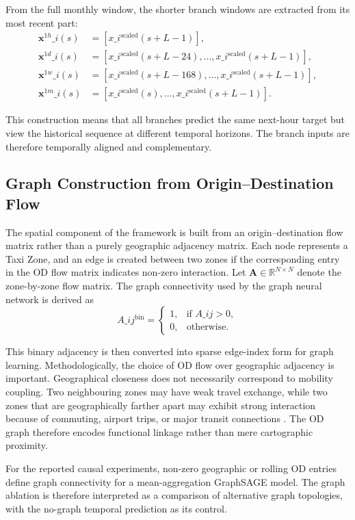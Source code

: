 \documentclass[12pt,a4paper]{report}
\begin{document}
From the full monthly window, the shorter branch windows are extracted from its most recent part:
\begin{align*}
	\mathbf{x}^{1h}\_i(s) &= [x\_i^{\text{scaled}}(s+L-1)],\\
	\mathbf{x}^{1d}\_i(s) &= [x\_i^{\text{scaled}}(s+L-24), \dots, x\_i^{\text{scaled}}(s+L-1)],\\
	\mathbf{x}^{1w}\_i(s) &= [x\_i^{\text{scaled}}(s+L-168), \dots, x\_i^{\text{scaled}}(s+L-1)],\\
	\mathbf{x}^{1m}\_i(s) &= [x\_i^{\text{scaled}}(s), \dots, x\_i^{\text{scaled}}(s+L-1)].
\end{align*}

This construction means that all branches predict the same next-hour target but view the historical sequence at different temporal horizons. The branch inputs are therefore temporally aligned and complementary.

\subsection{Graph Construction from Origin--Destination Flow}

The spatial component of the framework is built from an origin--destination flow matrix rather than a purely geographic adjacency matrix. Each node represents a Taxi Zone, and an edge is created between two zones if the corresponding entry in the OD flow matrix indicates non-zero interaction. Let \(\mathbf{A} \in \mathbb{R}^{N \times N}\) denote the zone-by-zone flow matrix. The graph connectivity used by the graph neural network is derived as
\[
A\_{ij}^{\text{bin}} =
\begin{cases}
	1, & \text{if } A\_{ij} > 0,\\
	0, & \text{otherwise}.
\end{cases}
\]

This binary adjacency is then converted into sparse edge-index form for graph learning. Methodologically, the choice of OD flow over geographic adjacency is important. Geographical closeness does not necessarily correspond to mobility coupling. Two neighbouring zones may have weak travel exchange, while two zones that are geographically farther apart may exhibit strong interaction because of commuting, airport trips, or major transit connections \cite{ke2021od,jiang2022survey}. The OD graph therefore encodes functional linkage rather than mere cartographic proximity.

For the reported causal experiments, non-zero geographic or rolling OD entries define graph connectivity for a mean-aggregation GraphSAGE model. The graph ablation is therefore interpreted as a comparison of alternative graph topologies, with the no-graph temporal prediction as its control.
\end{document}
